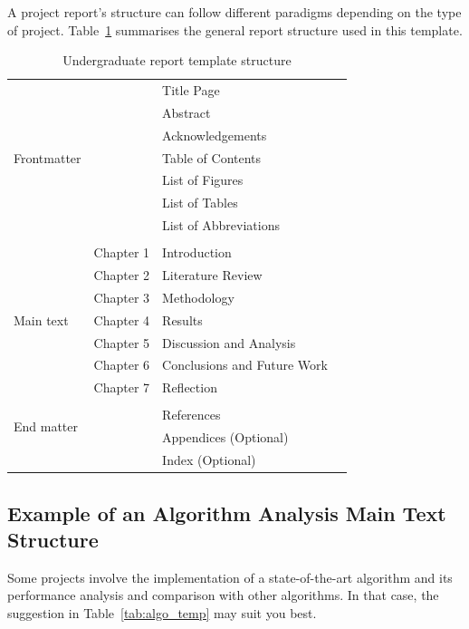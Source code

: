 A project report's structure can follow different paradigms depending on the 
type of project. Table~\ref{tab:gen_template} summarises the general report 
structure used in this template.

\begin{table}[!ht]
    \centering
    \caption{Undergraduate report template structure}
    \label{tab:gen_template}
    \begin{tabular}{llll}
        \toprule
        \multirow{7}{3cm}{Frontmatter}
        & & Title Page & \\
        & & Abstract &    \\
        & & Acknowledgements & \\
        & & Table of Contents &    \\
        & & List of Figures   &    \\
        & & List of Tables    &    \\
        & & List of Abbreviations  &    \\
        & &   &    \\
        \multirow{7}{3cm}{Main text}
        & Chapter 1 & Introduction   &    \\
        & Chapter 2 & Literature Review   &    \\
        & Chapter 3 & Methodology   &    \\
        & Chapter 4 & Results    &    \\
        & Chapter 5 & Discussion and Analysis  &    \\
        & Chapter 6 & Conclusions and Future Work  &    \\
        & Chapter 7 & Reflection  &    \\ %
        & &   &    \\
        \multirow{2}{3cm}{End matter}
        & & References  &    \\
        & & Appendices (Optional)  &    \\
        & & Index (Optional)  &    \\
        \bottomrule
    \end{tabular}
\end{table}

\subsection{Example of an Algorithm Analysis Main Text Structure}
\label{subsec:algo_struct}
Some projects involve the implementation of a state-of-the-art algorithm and 
its performance analysis and comparison with other algorithms. In that case, 
the suggestion in Table~\ref{tab:algo_temp} may suit you best.

